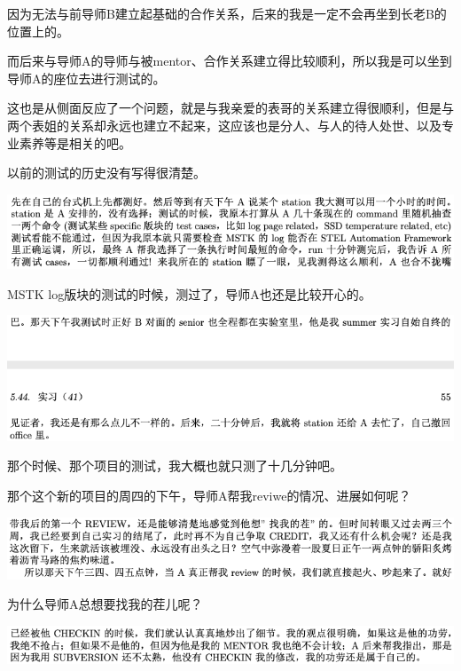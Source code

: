 \documentclass[9pt, b5paper]{article}
\begin{document}
因为无法与前导师B建立起基础的合作关系，后来的我是一定不会再坐到长老B的位置上的。 

而后来与导师A的导师与被mentor、合作关系建立得比较顺利，所以我是可以坐到导师A的座位去进行测试的。

这也是从侧面反应了一个问题，就是与我亲爱的表哥的关系建立得很顺利，但是与两个表姐的关系却永远也建立不起来，这应该也是分人、与人的待人处世、以及专业素养等是相关的吧。 

以前的测试的历史没有写得很清楚。 

\begin{center}
\includegraphics[width=.9\linewidth]{./pic/backups_plans_20210514_121052.png}
\end{center}

MSTK log版块的测试的时候，测过了，导师A也还是比较开心的。 

\begin{center}
\includegraphics[width=.9\linewidth]{./pic/backups_plans_20210514_121200.png}
\end{center}

那个时候、那个项目的测试，我大概也就只测了十几分钟吧。

那个这个新的项目的周四的下午，导师A帮我reviwe的情况、进展如何呢？

\begin{center}
\includegraphics[width=.9\linewidth]{./pic/backups_plans_20210514_125439.png}
\end{center}

为什么导师A总想要找我的茬儿呢？

\begin{center}
\includegraphics[width=.9\linewidth]{./pic/backups_plans_20210514_125619.png}
\end{center}
\end{document}
